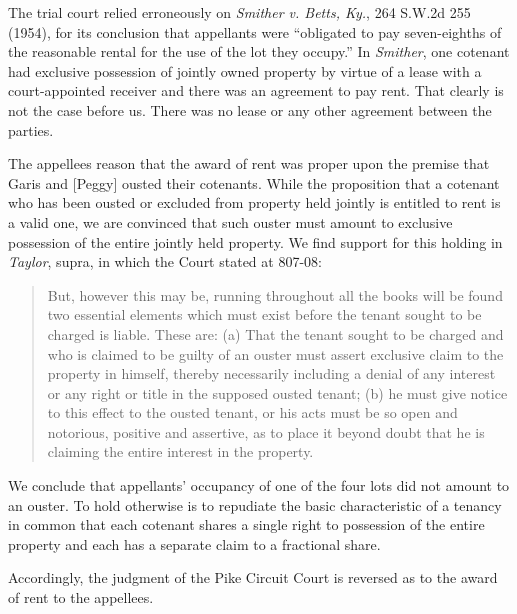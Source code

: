 The trial court relied erroneously on \emph{Smither v. Betts, Ky.}, 264 S.W.2d
255 (1954), for its conclusion that appellants were ``obligated to pay
seven-eighths of the reasonable rental for the use of the lot they occupy.'' In
\textit{Smither}, one cotenant had exclusive possession of jointly owned
property by virtue of a lease with a court-appointed receiver and there was an
agreement to pay rent. That clearly is not the case before us. There was no
lease or any other agreement between the parties.

The appellees reason that the award of rent was proper upon the premise that
Garis and [Peggy] ousted their cotenants. While the proposition that a cotenant
who has been ousted or excluded from property held jointly is entitled to rent
is a valid one, we are convinced that such ouster must amount to exclusive
possession of the entire jointly held property. We find support for this
holding in \emph{Taylor}, supra, in which the Court stated at 807-08:
\begin{quote}
But, however this may be, running throughout all the books will be found two
essential elements which must exist before the tenant sought to be charged is
liable. These are: (a) That the tenant sought to be charged and who is claimed
to be guilty of an ouster must assert exclusive claim to the property in
himself, thereby necessarily including a denial of any interest or any right or
title in the supposed ousted tenant; (b) he must give notice to this effect to
the ousted tenant, or his acts must be so open and notorious, positive and
assertive, as to place it beyond doubt that he is claiming the entire interest
in the property.
\end{quote}
We conclude that appellants' occupancy of one of the four lots did not amount to
an ouster. To hold otherwise is to repudiate the basic characteristic of a
tenancy in common that each cotenant shares a single right to possession of the
entire property and each has a separate claim to a fractional share.

Accordingly, the judgment of the Pike Circuit Court is reversed as to the award
of rent to the appellees.

